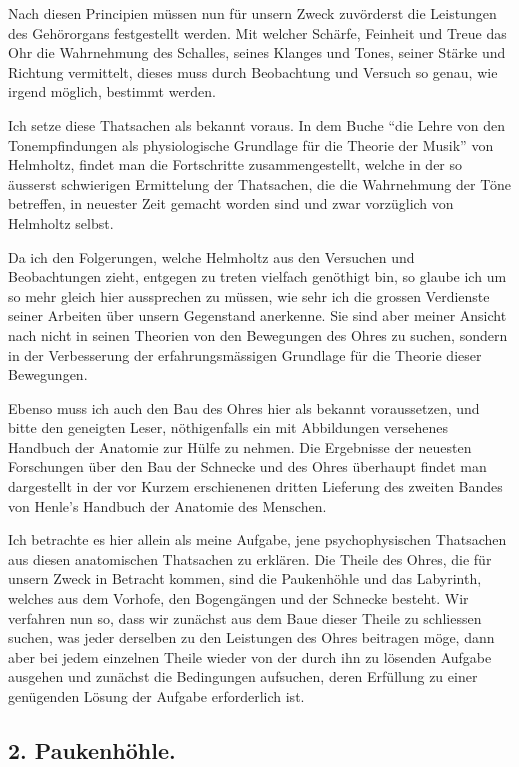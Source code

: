 \documentclass[12pt,a4paper]{article}
\begin{document}
Nach diesen Principien m\"ussen nun f\"ur unsern Zweck zuv\"orderst die Leistungen des Geh\"ororgans festgestellt werden. Mit welcher Sch\"arfe, Feinheit und Treue das Ohr die Wahrnehmung des Schalles, seines Klanges und Tones, seiner St\"arke und Richtung vermittelt, dieses muss durch Beobachtung und Versuch so genau, wie irgend m\"oglich, bestimmt werden.

Ich setze diese Thatsachen als bekannt voraus. In dem Buche ``die Lehre von den Tonempfindungen als physiologische Grundlage f\"ur die Theorie der Musik'' von Helmholtz, findet man die Fortschritte zusammengestellt, welche in der so \"ausserst schwierigen Ermittelung der Thatsachen, die die Wahrnehmung der T\"one betreffen, in neuester Zeit gemacht worden sind und zwar vorz\"uglich von Helmholtz selbst.

Da ich den Folgerungen, welche Helmholtz aus den Versuchen und Beobachtungen zieht, entgegen zu treten vielfach gen\"othigt bin, so glaube ich um so mehr gleich hier aussprechen zu m\"ussen, wie sehr ich die grossen Verdienste seiner Arbeiten \"uber unsern Gegenstand anerkenne. Sie sind aber meiner Ansicht nach nicht in seinen Theorien von den Bewegungen des Ohres zu suchen, sondern in der Verbesserung der erfahrungsm\"assigen Grundlage f\"ur die Theorie dieser Bewegungen.

Ebenso muss ich auch den Bau des Ohres hier als bekannt voraussetzen, und bitte den geneigten Leser, n\"othigenfalls ein mit Abbildungen versehenes Handbuch der Anatomie zur H\"ulfe zu nehmen. Die Ergebnisse der neuesten Forschungen \"uber den Bau der Schnecke und des Ohres \"uberhaupt findet man dargestellt in der vor Kurzem erschienenen dritten Lieferung des zweiten Bandes von Henle's Handbuch der Anatomie des Menschen.

Ich betrachte es hier allein als meine Aufgabe, jene psychophysischen Thatsachen aus diesen anatomischen Thatsachen zu erkl\"aren. Die Theile des Ohres, die f\"ur unsern Zweck in Betracht kommen, sind die Paukenh\"ohle und das Labyrinth, welches aus dem Vorhofe, den Bogeng\"angen und der Schnecke besteht. Wir verfahren nun so, dass wir zun\"achst aus dem Baue dieser Theile zu schliessen suchen, was jeder derselben zu den Leistungen des Ohres beitragen m\"oge, dann aber bei jedem einzelnen Theile wieder von der durch ihn zu l\"osenden Aufgabe ausgehen und zun\"achst die Bedingungen aufsuchen, deren Erf\"ullung zu einer gen\"ugenden L\"osung der Aufgabe erforderlich ist.

\subsection*{2. Paukenh\"ohle.}
\end{document}

